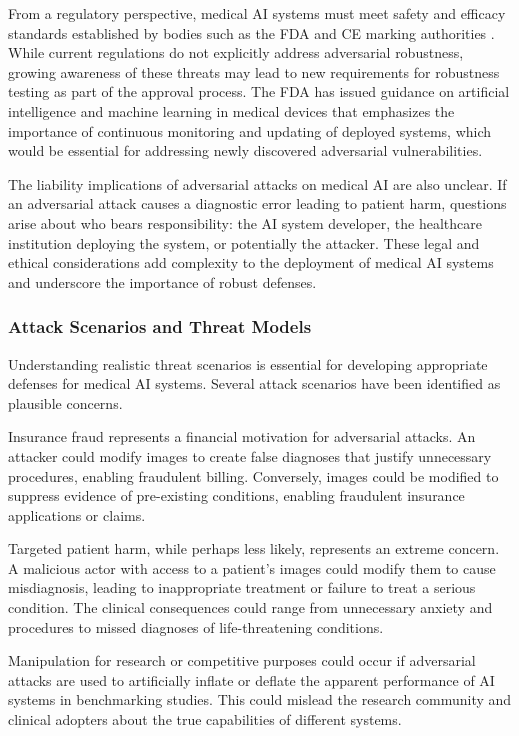 \documentclass[12pt,a4paper]{article}
\begin{document}
From a regulatory perspective, medical AI systems must meet safety and efficacy standards established by bodies such as the FDA and CE marking authorities \cite{fda2021}. While current regulations do not explicitly address adversarial robustness, growing awareness of these threats may lead to new requirements for robustness testing as part of the approval process. The FDA has issued guidance on artificial intelligence and machine learning in medical devices that emphasizes the importance of continuous monitoring and updating of deployed systems, which would be essential for addressing newly discovered adversarial vulnerabilities.

The liability implications of adversarial attacks on medical AI are also unclear. If an adversarial attack causes a diagnostic error leading to patient harm, questions arise about who bears responsibility: the AI system developer, the healthcare institution deploying the system, or potentially the attacker. These legal and ethical considerations add complexity to the deployment of medical AI systems and underscore the importance of robust defenses.

\subsubsection{Attack Scenarios and Threat Models}

Understanding realistic threat scenarios is essential for developing appropriate defenses for medical AI systems. Several attack scenarios have been identified as plausible concerns.

Insurance fraud represents a financial motivation for adversarial attacks. An attacker could modify images to create false diagnoses that justify unnecessary procedures, enabling fraudulent billing. Conversely, images could be modified to suppress evidence of pre-existing conditions, enabling fraudulent insurance applications or claims.

Targeted patient harm, while perhaps less likely, represents an extreme concern. A malicious actor with access to a patient's images could modify them to cause misdiagnosis, leading to inappropriate treatment or failure to treat a serious condition. The clinical consequences could range from unnecessary anxiety and procedures to missed diagnoses of life-threatening conditions.

Manipulation for research or competitive purposes could occur if adversarial attacks are used to artificially inflate or deflate the apparent performance of AI systems in benchmarking studies. This could mislead the research community and clinical adopters about the true capabilities of different systems.
\end{document}
